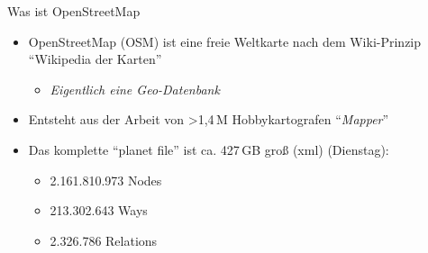 \documentclass{beamer}
\begin{document}
\begin{frame}{Was ist OpenStreetMap}

\begin{itemize}
  \item OpenStreetMap (OSM) ist eine freie Weltkarte nach dem Wiki-Prinzip "`Wikipedia der Karten"'
    \begin{itemize}
      \item \emph{Eigentlich eine Geo-Datenbank}
    \end{itemize}
\pause
  \item Entsteht aus der Arbeit von \textgreater 1,4\,M Hobbykartografen "`\emph{Mapper}"'

 \item Das komplette "`planet file"' ist ca. 427\,GB groß (xml) (Dienstag):
  \begin{itemize}
    \item 2.161.810.973 Nodes
    \item 213.302.643 Ways
    \item 2.326.786 Relations
  \end{itemize}

\end{itemize}



\end{frame}
\end{document}
